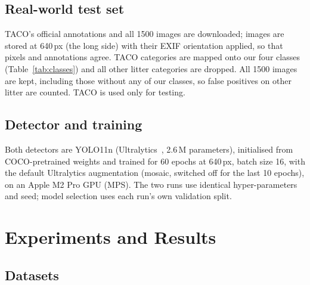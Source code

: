 \documentclass[11pt,a4paper]{article}
\begin{document}
\subsection{Real-world test set}

TACO's official annotations and all 1500 images are downloaded; images are stored at 640\,px
(the long side) with their EXIF orientation applied, so that pixels and annotations agree. TACO
categories are mapped onto our four classes (Table~\ref{tab:classes}) and all other litter
categories are dropped. All 1500 images are kept, including those without any of our classes, so
false positives on other litter are counted. TACO is used only for testing.

\subsection{Detector and training}

Both detectors are YOLO11n (Ultralytics~\cite{yolo11}, 2.6\,M parameters), initialised from
COCO-pretrained weights and trained for 60 epochs at 640\,px, batch size 16, with the default
Ultralytics augmentation (mosaic, switched off for the last 10 epochs), on an Apple M2 Pro GPU
(MPS). The two runs use identical hyper-parameters and seed; model selection uses each run's own
validation split.

\section{Experiments and Results}

\subsection{Datasets}
\end{document}
